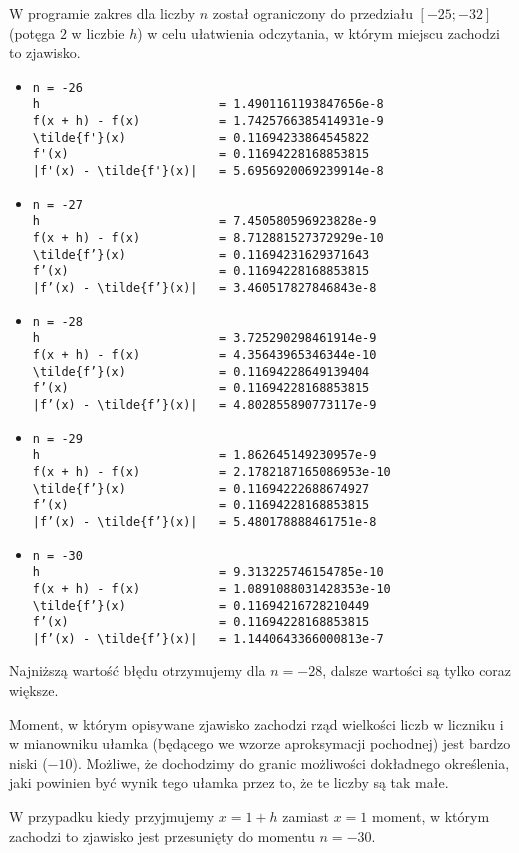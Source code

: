 \documentclass[10pt]{article}
\begin{document}
\noindent W programie zakres dla liczby $n$ został ograniczony do przedziału $[-25; -32]$ (potęga $2$ w liczbie $h$) w celu ułatwienia odczytania, w którym miejscu zachodzi to zjawisko.

\begin{itemize}
    \item \begin{verbatim}
n = -26
h                         = 1.4901161193847656e-8
f(x + h) - f(x)           = 1.7425766385414931e-9
\tilde{f'}(x)             = 0.11694233864545822
f'(x)                     = 0.11694228168853815
|f'(x) - \tilde{f'}(x)|   = 5.6956920069239914e-8
    \end{verbatim}
    \item \begin{verbatim}
n = -27
h                         = 7.450580596923828e-9
f(x + h) - f(x)           = 8.712881527372929e-10
\tilde{f’}(x)             = 0.11694231629371643
f’(x)                     = 0.11694228168853815
|f’(x) - \tilde{f’}(x)|   = 3.460517827846843e-8
    \end{verbatim}
    \item \begin{verbatim}
n = -28
h                         = 3.725290298461914e-9
f(x + h) - f(x)           = 4.35643965346344e-10
\tilde{f’}(x)             = 0.11694228649139404
f’(x)                     = 0.11694228168853815
|f’(x) - \tilde{f’}(x)|   = 4.802855890773117e-9
    \end{verbatim}
    \item \begin{verbatim}
n = -29
h                         = 1.862645149230957e-9
f(x + h) - f(x)           = 2.1782187165086953e-10
\tilde{f’}(x)             = 0.11694222688674927
f’(x)                     = 0.11694228168853815
|f’(x) - \tilde{f’}(x)|   = 5.480178888461751e-8
    \end{verbatim}
    \item \begin{verbatim}
n = -30
h                         = 9.313225746154785e-10
f(x + h) - f(x)           = 1.0891088031428353e-10
\tilde{f’}(x)             = 0.11694216728210449
f’(x)                     = 0.11694228168853815
|f’(x) - \tilde{f’}(x)|   = 1.1440643366000813e-7
    \end{verbatim}
\end{itemize}

\noindent Najniższą wartość błędu otrzymujemy dla $n = -28$, dalsze wartości są tylko coraz większe.

\noindent Moment, w którym opisywane zjawisko zachodzi rząd wielkości liczb w liczniku i w mianowniku ułamka (będącego we wzorze aproksymacji pochodnej) jest bardzo niski ($-10$). Możliwe, że dochodzimy do granic możliwości dokładnego określenia, jaki powinien być wynik tego ułamka przez to, że te liczby są tak małe.

W przypadku kiedy przyjmujemy $x = 1 + h$ zamiast $x=1$ moment, w którym zachodzi to zjawisko jest przesunięty do momentu $n = -30$.
\end{document}
